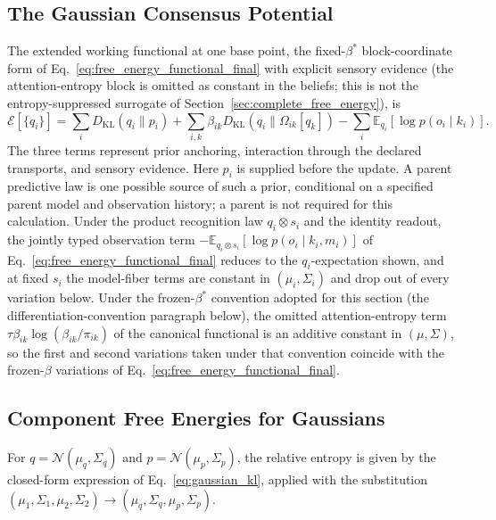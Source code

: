 \subsection{The Gaussian Consensus Potential}

The extended working functional at one base point, the fixed-$\beta^*$ block-coordinate form of Eq.~\eqref{eq:free_energy_functional_final} with explicit sensory evidence (the attention-entropy block is omitted as constant in the beliefs; this is not the entropy-suppressed surrogate of Section~\ref{sec:complete_free_energy}), is
\begin{equation}
\mathcal{E}[\{q_i\}] = \sum_i D_{\mathrm{KL}}(q_i \| p_i) + \sum_{i,k} \beta_{ik} D_{\mathrm{KL}}(q_i \| \Omega_{ik}[q_k]) - \sum_i \mathbb{E}_{q_i}[\log p(o_i \mid k_i)].
\label{eq:extended_free_energy}
\end{equation}
The three terms represent prior anchoring, interaction through the declared transports, and sensory evidence. Here $p_i$ is supplied before the update. A parent predictive law is one possible source of such a prior, conditional on a specified parent model and observation history; a parent is not required for this calculation. Under the product recognition law $q_i \otimes s_i$ and the identity readout, the jointly typed observation term $-\mathbb{E}_{q_i \otimes s_i}[\log p(o_i \mid k_i, m_i)]$ of Eq.~\eqref{eq:free_energy_functional_final} reduces to the $q_i$-expectation shown, and at fixed $s_i$ the model-fiber terms are constant in $(\mu_i, \Sigma_i)$ and drop out of every variation below. Under the frozen-$\beta^*$ convention adopted for this section (the differentiation-convention paragraph below), the omitted attention-entropy term $\tau\beta_{ik}\log(\beta_{ik}/\pi_{ik})$ of the canonical functional is an additive constant in $(\mu, \Sigma)$, so the first and second variations taken under that convention coincide with the frozen-$\beta$ variations of Eq.~\eqref{eq:free_energy_functional_final}.

\subsection{Component Free Energies for Gaussians}

For $q = \mathcal{N}(\mu_q, \Sigma_q)$ and $p = \mathcal{N}(\mu_p, \Sigma_p)$, the relative entropy is given by the closed-form expression of Eq.~\eqref{eq:gaussian_kl}, applied with the substitution $(\mu_1, \Sigma_1, \mu_2, \Sigma_2) \to (\mu_q, \Sigma_q, \mu_p, \Sigma_p)$.


